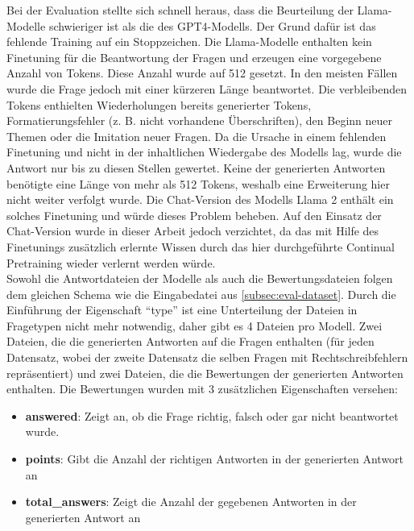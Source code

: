 Bei der Evaluation stellte sich schnell heraus, dass die Beurteilung der Llama-Modelle schwieriger ist als die des GPT4-Modells.
Der Grund dafür ist das fehlende Training auf ein Stoppzeichen.
Die Llama-Modelle enthalten kein Finetuning für die Beantwortung der Fragen und erzeugen eine vorgegebene Anzahl von Tokens.
Diese Anzahl wurde auf 512 gesetzt.
In den meisten Fällen wurde die Frage jedoch mit einer kürzeren Länge beantwortet.
Die verbleibenden Tokens enthielten Wiederholungen bereits generierter Tokens, Formatierungsfehler (z. B. nicht vorhandene Überschriften), den Beginn neuer Themen oder die Imitation neuer Fragen.
Da die Ursache in einem fehlenden Finetuning und nicht in der inhaltlichen Wiedergabe des Modells lag, wurde die Antwort nur bis zu diesen Stellen gewertet.
Keine der generierten Antworten benötigte eine Länge von mehr als 512 Tokens, weshalb eine Erweiterung hier nicht weiter verfolgt wurde.
Die Chat-Version des Modells Llama 2 enthält ein solches Finetuning und würde dieses Problem beheben.
Auf den Einsatz der Chat-Version wurde in dieser Arbeit jedoch verzichtet, da das mit Hilfe des Finetunings zusätzlich erlernte Wissen durch das hier durchgeführte Continual Pretraining wieder verlernt werden würde.\\

Sowohl die Antwortdateien der Modelle als auch die Bewertungsdateien folgen dem gleichen Schema wie die Eingabedatei aus \cref{subsec:eval-dataset}. Durch die Einführung der Eigenschaft \enquote{type} ist eine Unterteilung der Dateien in Fragetypen nicht mehr notwendig, daher gibt es 4 Dateien pro Modell.
Zwei Dateien, die die generierten Antworten auf die Fragen enthalten (für jeden Datensatz, wobei der zweite Datensatz die selben Fragen mit Rechtschreibfehlern repräsentiert) und zwei Dateien, die die Bewertungen der generierten Antworten enthalten.
Die Bewertungen wurden mit 3 zusätzlichen Eigenschaften versehen:

\begin{itemize}
    \item \textbf{answered}: Zeigt an, ob die Frage richtig, falsch oder gar nicht beantwortet wurde.
    \item \textbf{points}: Gibt die Anzahl der richtigen Antworten in der generierten Antwort an
    \item \textbf{total\_answers}: Zeigt die Anzahl der gegebenen Antworten in der generierten Antwort an
\end{itemize}

